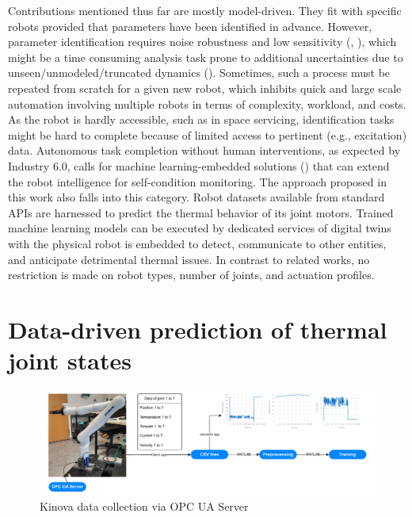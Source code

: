 \documentclass{ifacconf}
\begin{document}
Contributions mentioned thus far are mostly model-driven. They fit  with specific robots provided that parameters have been  identified in advance. However, parameter identification requires   noise robustness and low  sensitivity (\cite{zhang2024model}, \cite{de2024non}), which might be a time consuming analysis task  prone to additional uncertainties due to unseen$\slash$unmodeled$\slash$truncated dynamics (\cite{shang2024general}). Sometimes, such a process must  be repeated from scratch for a given new robot, which inhibits quick and large scale automation involving multiple robots in terms of complexity, workload, and costs. As the robot is hardly accessible, such as in space servicing,  identification tasks might be hard to complete because of limited access to pertinent (e.g., excitation) data. Autonomous task completion without human interventions, as expected by Industry 6.0, calls for machine learning-embedded solutions (\cite{carayannis2024toward}) that can extend the robot intelligence for self-condition monitoring. The approach proposed in this work also falls into this category. Robot datasets available from standard APIs are harnessed to predict the thermal behavior of its joint motors. Trained machine learning models can be executed by dedicated services of  digital twins with the physical robot is embedded to detect, communicate to other entities, and anticipate  detrimental thermal issues. In contrast to related works, no restriction is made  on  robot types, number of joints, and actuation profiles.

\section{Data-driven prediction of  thermal joint states}

\begin{figure}
  \begin{center}
    \includegraphics[width=\textwidth]{pictures/DataAquisition.drawio.pdf} 
    \caption{Kinova data collection via OPC UA Server} 
    \label{fig:DataAquisition}
  \end{center}
\end{figure}
\end{document}
